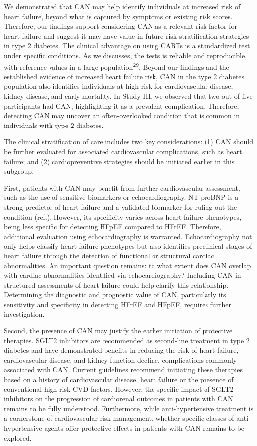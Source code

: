 \documentclass[
  a4paper,
  headsepline=true,
  open=any]{scrbook}
\begin{document}
We demonstrated that CAN may help identify individuals at increased risk
of heart failure, beyond what is captured by symptoms or existing risk
scores. Therefore, our findings support considering CAN as a relevant
risk factor for heart failure and suggest it may have value in future
risk stratification strategies in type 2 diabetes. The clinical
advantage on using CARTs is a standardized test under specific
conditions. As we discusses, the tests is reliable and reproducible,
with reference values in a large population\textsuperscript{29}. Beyond
our findings and the established evidence of increased heart failure
risk, CAN in the type 2 diabetes population also identifies individuals
at high risk for cardiovascular disease, kidney disease, and early
mortality. In Study III, we observed that two out of five participants
had CAN, highlighting it as a prevalent complication. Therefore,
detecting CAN may uncover an often-overlooked condition that is common
in individuals with type 2 diabetes.

The clinical stratification of care includes two key considerations: (1)
CAN should be further evaluated for associated cardiovascular
complications, such as heart failure; and (2) cardiopreventive
strategies should be initiated earlier in this subgroup.

First, patients with CAN may benefit from further cardiovascular
assessment, such as the use of sensitive biomarkers or echocardiography.
NT-proBNP is a strong predictor of heart failure and a validated
biomarker for ruling out the condition (ref.). However, its specificity
varies across heart failure phenotypes, being less specific for
detecting HFpEF compared to HFrEF. Therefore, additional evaluation
using echocardiography is warranted. Echocardiography not only helps
classify heart failure phenotypes but also identifies preclinical stages
of heart failure through the detection of functional or structural
cardiac abnormalities. An important question remains: to what extent
does CAN overlap with cardiac abnormalities identified via
echocardiography? Including CAN in structured assessments of heart
failure could help clarify this relationship. Determining the diagnostic
and prognostic value of CAN, particularly its sensitivity and
specificity in detecting HFrEF and HFpEF, requires further
investigation.

Second, the presence of CAN may justify the earlier initiation of
protective therapies. SGLT2 inhibitors are recommended as second-line
treatment in type 2 diabetes and have demonstrated benefits in reducing
the risk of heart failure, cardiovascular disease, and kidney function
decline, complications commonly associated with CAN. Current guidelines
recommend initiating these therapies based on a history of
cardiovascular disease, heart failure or the presence of conventional
high-risk CVD factors. However, the specific impact of SGLT2 inhibitors
on the progression of cardiorenal outcomes in patients with CAN remains
to be fully understood. Furthermore, while anti-hypertensive treatment
is a cornerstone of cardiovascular risk management, whether specific
classes of anti-hypertensive agents offer protective effects in patients
with CAN remains to be explored.
\end{document}
